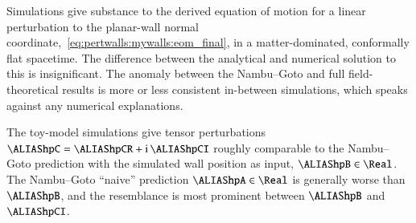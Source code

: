 






Simulations give substance to the derived equation of motion for a linear perturbation to the planar-wall normal coordinate,~\cref{eq:pertwalls:mywalls:eom_final}, in a matter-dominated, conformally flat spacetime. The difference between the analytical and numerical solution to this is insignificant. The anomaly between the Nambu--Goto and full field-theoretical results is more or less consistent in-between simulations, which speaks against any numerical explanations.


The toy-model simulations give tensor perturbations $\hpC= \hpCR+ \im \, \hpCI $ roughly comparable to the Nambu--Goto prediction with the simulated wall position as input, $\hpB\in \Real$. The Nambu--Goto ``naive'' prediction $\hpA\in \Real$ is generally worse than $\hpB$, and the resemblance is most prominent between $\hpB$ and $\hpCI$.



